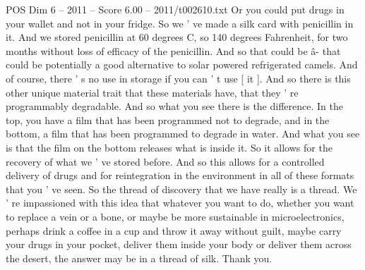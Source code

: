 \begin{textsample}{POS Dim 6 – 2011 – Score 6.00 – 2011/t002610.txt}
Or you could put drugs in your wallet and not in your fridge.
So we ' ve made a silk card with penicillin in it.
And we stored penicillin at 60 degrees C, so 140 degrees Fahrenheit, for two months without loss of efficacy of the penicillin.
And so that could be â- that could be potentially a good alternative to solar powered refrigerated camels.
And of course, there ' s no use in storage if you can ' t use [ it ].
And so there is this other unique material trait that these materials have, that they ' re programmably degradable.
And so what you see there is the difference.
In the top, you have a film that has been programmed not to degrade, and in the bottom, a film that has been programmed to degrade in water.
And what you see is that the film on the bottom releases what is inside it.
So it allows for the recovery of what we ' ve stored before.
And so this allows for a controlled delivery of drugs and for reintegration in the environment in all of these formats that you ' ve seen.
So the thread of discovery that we have really is a thread.
We ' re impassioned with this idea that whatever you want to do, whether you want to replace a vein or a bone, or maybe be more sustainable in microelectronics, perhaps drink a coffee in a cup and throw it away without guilt, maybe carry your drugs in your pocket, deliver them inside your body or deliver them across the desert, the answer may be in a thread of silk.
Thank you.

\end{textsample}
